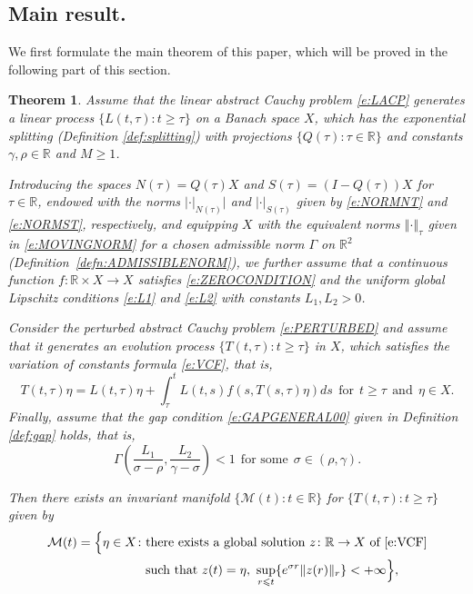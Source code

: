 \documentclass[a4paper,11pt,reqno]{amsart}
\theoremstyle{plain}
\newtheorem{thm}[lem]{Theorem}
\theoremstyle{definition}
\numberwithin{equation}{section}
\newcommand{\R}{\mathbb{R}}
\newcommand{\norm}[1]{\left\Vert#1\right\Vert}
\renewcommand{\geq}{\geqslant}
\renewcommand{\leq}{\leqslant}
\begin{document}
\subsection{Main result.} We first formulate the main theorem of this paper, which will be proved in the following part of this section.


\begin{thm}\label{thm:MAIN1}
	Assume that the linear abstract Cauchy problem \eqref{e:LACP} generates a linear process $\{L(t,\tau)\colon t\geq\tau\}$ on a Banach space $X$, which has the exponential splitting (Definition \ref{def:splitting}) with projections $\{Q(\tau)\colon \tau\in\R\}$ and constants $\gamma,\rho\in\R$ and $M\geq 1$.
	
	Introducing the spaces $N(\tau)=Q(\tau)X$ and $S(\tau)=(I-Q(\tau))X$ for $\tau\in\R$, endowed with the norms $|\cdot|_{N(\tau)}|$ and $|\cdot|_{S(\tau)}$ given by \eqref{e:NORMNT} and \eqref{e:NORMST}, respectively,
	and equipping $X$ with the equivalent norms $\norm{\cdot}_{\tau}$ given in \eqref{e:MOVINGNORM} for a chosen admissible norm $\Gamma$ on $\R^2$ (Definition~\ref{defn:ADMISSIBLENORM}), we further assume that a continuous function $f\colon\R\times X\to X$ satisfies \eqref{e:ZEROCONDITION} and the uniform global Lipschitz conditions  
	\eqref{e:L1} and \eqref{e:L2} with constants $L_1,L_2>0$.
	
	Consider the perturbed abstract Cauchy problem \eqref{e:PERTURBED} and assume that it generates an evolution process $\{T(t,\tau)\colon t\geq\tau\}$ in $X$, which satisfies the variation of constants formula \eqref{e:VCF}, that is,
	\begin{equation*}
		T(t,\tau)\eta=L(t,\tau)\eta+\int_{\tau}^{t}L(t,s)f(s,T(s,\tau)\eta)ds\ \ \text{for}\ \  t\geq\tau\ \ \text{and}\ \ \eta\in X.
	\end{equation*}
	Finally, assume that the gap condition \eqref{e:GAPGENERAL00} given in Definition \ref{def:gap} holds, that is,
	$$\Gamma\left(\frac{L_1}{\sigma-\rho},\frac{L_2}{\gamma-\sigma}\right)<1\ \ \text{for some}\ \ \sigma\in (\rho,\gamma).$$ 
    
    Then there exists an invariant manifold $\{\mathcal{M}(t)\colon t\in \mathbb{R}\}$ for $\{T(t,\tau)\colon t\geq \tau\}$ given by 
\begin{equation}\label{eq-characterization-inertail}
\begin{split}
\mathcal{M}(t)=\Big\{\eta\in X\colon &\text{there exists a global solution}\ z\colon\R\to X\ \text{of}\ \eqref{e:VCF} \\
&\text{such that } z(t)=\eta, \ \sup_{r\leq t }\{e^{\sigma r}\|z(r)\|_r\}<+\infty\Big\},
\end{split} 
\end{equation}


\end{thm}
\end{document}
